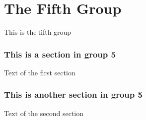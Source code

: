 \hypertarget{group__group5}{}\section{The Fifth Group}
\label{group__group5}
This is the fifth group \hypertarget{mypage1}{}\subsubsection{This is a section in group 5}\label{mypage1}
Text of the first section \hypertarget{mypage2}{}\subsubsection{This is another section in group 5}\label{mypage2}
Text of the second section 